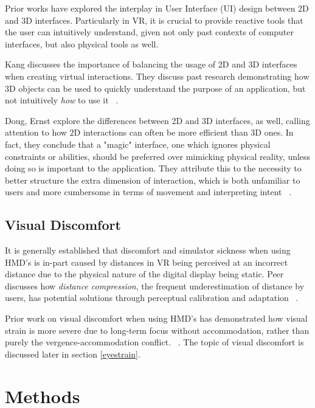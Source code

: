 \documentclass[10pt,twocolumn,letterpaper]{article}
\begin{document}
Prior works have explored the interplay in User Interface (UI) design between 2D and 3D interfaces. Particularly in VR, it is crucial to provide reactive tools that the user can intuitively understand, given not only past contexts of computer interfaces, but also physical tools as well.

Kang discusses the importance of balancing the usage of 2D and 3D interfaces when creating virtual interactions. They discuss past research demonstrating how 3D objects can be used to quickly understand the purpose of an application, but not intuitively \textit{how} to use it ~\cite{7892351}.

Doug, Ernst \etal explore the differences between 2D and 3D interfaces, as well, calling attention to how 2D interactions can often be more efficient than 3D ones. In fact, they conclude that a "magic" interface, one which ignores physical constraints or abilities, should be preferred over mimicking physical reality, unless doing so is important to the application. They attribute this to the necessity to better structure the extra dimension of interaction, which is both unfamiliar to users and more cumbersome in terms of movement and interpreting intent ~\cite{442977420010201}.

\subsection{Visual Discomfort}

It is generally established that discomfort and simulator sickness when using HMD's is in-part caused by distances in VR being perceived at an incorrect distance due to the physical nature of the digital display being static. Peer discusses how \textit{distance compression}, the frequent underestimation of distance by users, has potential solutions through perceptual calibration and adaptation ~\cite{7892353}.

Prior work on visual discomfort when using HMD's has demonstrated how visual strain is more severe due to long-term focus without accommodation, rather than purely the vergence-accommodation conflict. ~\cite{7892270}. The topic of visual discomfort is discussed later in section \ref{eyestrain}.


\section{Methods}
\end{document}

